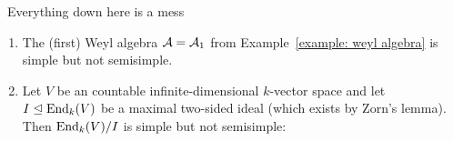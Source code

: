 \noindent\hrulefill\, Everything down here is a mess \,\hrulefill




\begin{example}
  \label{example: simple but not semisimple}
  \leavevmode
  \begin{enumerate}
    \item
      The (first) Weyl algebra $\mathcal{A} = \mathcal{A}_1$ from Example~\ref{example: weyl algebra} is simple but not semisimple.
    \item
      Let $V$ be an countable infinite-dimensional $k$-vector space and let $I \trianglelefteq \operatorname{End}_k(V)$ be a maximal two-sided ideal (which exists by Zorn’s lemma).
      Then $\operatorname{End}_k(V)/I$ is simple but not semisimple:
  \end{enumerate}
\end{example}




% 
% 
%   
% 
% 





